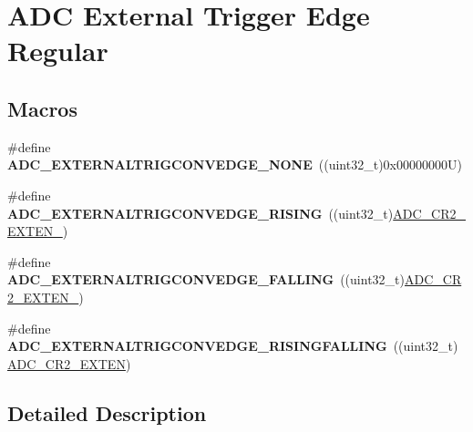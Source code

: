 \hypertarget{group___a_d_c___external__trigger__edge___regular}{}\section{A\+DC External Trigger Edge Regular}
\label{group___a_d_c___external__trigger__edge___regular}
\subsection*{Macros}
\begin{DoxyCompactItemize}
\item 
\mbox{\label{group___a_d_c___external__trigger__edge___regular_gab2e3a19c05441925f9b9a482238994ac}} 
\#define {\bfseries A\+D\+C\+\_\+\+E\+X\+T\+E\+R\+N\+A\+L\+T\+R\+I\+G\+C\+O\+N\+V\+E\+D\+G\+E\+\_\+\+N\+O\+NE}~((uint32\+\_\+t)0x00000000\+U)
\item 
\mbox{\label{group___a_d_c___external__trigger__edge___regular_ga0aaa4e876de630733ca4ca4116b9608e}} 
\#define {\bfseries A\+D\+C\+\_\+\+E\+X\+T\+E\+R\+N\+A\+L\+T\+R\+I\+G\+C\+O\+N\+V\+E\+D\+G\+E\+\_\+\+R\+I\+S\+I\+NG}~((uint32\+\_\+t)\mbox{\hyperlink{group___peripheral___registers___bits___definition_ga3519da0cc6fbd31444a16244c70232e6}{A\+D\+C\+\_\+\+C\+R2\+\_\+\+E\+X\+T\+E\+N\+\_}})
\item 
\mbox{\label{group___a_d_c___external__trigger__edge___regular_ga15975c01b6a514f346272a1373239c54}} 
\#define {\bfseries A\+D\+C\+\_\+\+E\+X\+T\+E\+R\+N\+A\+L\+T\+R\+I\+G\+C\+O\+N\+V\+E\+D\+G\+E\+\_\+\+F\+A\+L\+L\+I\+NG}~((uint32\+\_\+t)\mbox{\hyperlink{group___peripheral___registers___bits___definition_ga17e37edddbb6ad791bffb350cca23d4d}{A\+D\+C\+\_\+\+C\+R2\+\_\+\+E\+X\+T\+E\+N\+\_}})
\item 
\mbox{\label{group___a_d_c___external__trigger__edge___regular_gab4221f5f52b5f75dc8cea701bb57be35}} 
\#define {\bfseries A\+D\+C\+\_\+\+E\+X\+T\+E\+R\+N\+A\+L\+T\+R\+I\+G\+C\+O\+N\+V\+E\+D\+G\+E\+\_\+\+R\+I\+S\+I\+N\+G\+F\+A\+L\+L\+I\+NG}~((uint32\+\_\+t)\mbox{\hyperlink{group___peripheral___registers___bits___definition_ga574b4d8e90655d0432882d620e629234}{A\+D\+C\+\_\+\+C\+R2\+\_\+\+E\+X\+T\+EN}})
\end{DoxyCompactItemize}


\subsection{Detailed Description}
